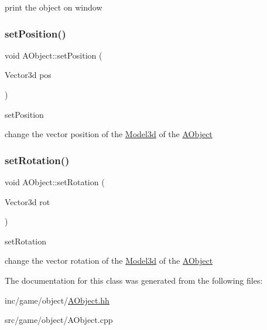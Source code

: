 print the object on window \mbox{\label{classAObject_ab4a2dc3dad1a54ff80d59c42a51479fb}} 
\subsubsection{\texorpdfstring{set\+Position()}{setPosition()}}
{\footnotesize\ttfamily void A\+Object\+::set\+Position (\begin{DoxyParamCaption}\item[{Vector3d}]{pos }\end{DoxyParamCaption})}



set\+Position 

change the vector position of the \hyperlink{classModel3d}{Model3d} of the \hyperlink{classAObject}{A\+Object} \mbox{\label{classAObject_a38ba628dcec6be910ce9d3c9f0de0de7}} 
\subsubsection{\texorpdfstring{set\+Rotation()}{setRotation()}}
{\footnotesize\ttfamily void A\+Object\+::set\+Rotation (\begin{DoxyParamCaption}\item[{Vector3d}]{rot }\end{DoxyParamCaption})}



set\+Rotation 

change the vector rotation of the \hyperlink{classModel3d}{Model3d} of the \hyperlink{classAObject}{A\+Object} 

The documentation for this class was generated from the following files\+:\begin{DoxyCompactItemize}
\item 
inc/game/object/\hyperlink{AObject_8hh}{A\+Object.\+hh}\item 
src/game/object/A\+Object.\+cpp\end{DoxyCompactItemize}
